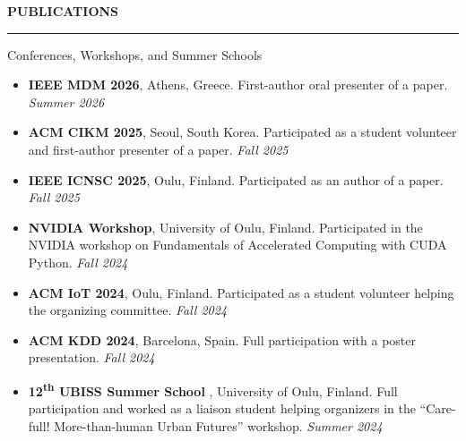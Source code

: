 \documentclass{resume}
\newenvironment{rSectionPlain}[1]{
  \sectionskip
  \MakeUppercase{\bf #1}
  \sectionlineskip
  \hrule
  \vspace{0.3em}
}{
  \par
}
\begin{document}

\begin{rSectionPlain}{Publications}

\nocite{*}
\printbibliography[heading=none]

\end{rSectionPlain}

\begin{rSection}{Conferences, Workshops, and Summer Schools}
\vspace{+.1cm}

\begin{itemize}

    \item {\bf IEEE MDM 2026}, Athens, Greece. First-author oral presenter of a paper. {\em Summer 2026}

    \item {\bf ACM CIKM 2025}, Seoul, South Korea. Participated as a student volunteer and first-author presenter of a paper. {\em Fall 2025}

    \item {\bf IEEE ICNSC 2025}, Oulu, Finland. Participated as an author of a paper. {\em Fall 2025}

    \item {\bf NVIDIA Workshop}, University of Oulu, Finland. Participated in the NVIDIA workshop on Fundamentals of Accelerated Computing with CUDA Python. {\em Fall 2024}

    \item {\bf ACM IoT 2024}, Oulu, Finland. Participated as a student volunteer helping the organizing committee. {\em Fall 2024}

    \item {\bf ACM KDD 2024}, Barcelona, Spain. Full participation with a poster presentation. {\em Fall 2024}

    \item {\bf 12\textsuperscript{th} UBISS Summer School }, University of Oulu, Finland. Full participation and worked as a liaison student helping organizers in the ``Care-full! More-than-human Urban Futures'' workshop. {\em Summer 2024}


\end{itemize}
\end{rSection}
\end{document}
